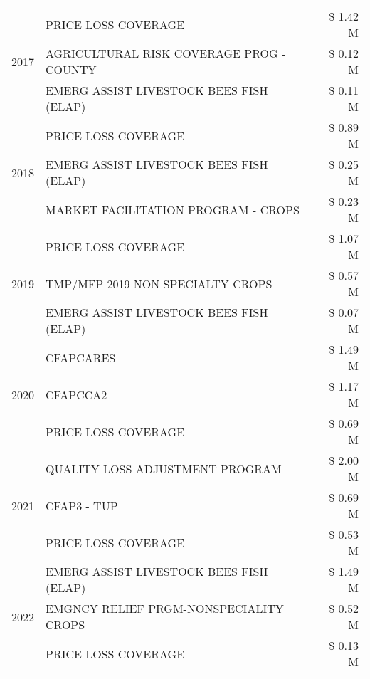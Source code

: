 \begin{tabular}{llr}
\cline{1-3}
\multirow[t]{3}{*}{2017} & PRICE LOSS COVERAGE & \$ 1.42 M \\
 & AGRICULTURAL RISK COVERAGE PROG - COUNTY & \$ 0.12 M \\
 & EMERG ASSIST LIVESTOCK BEES FISH (ELAP) & \$ 0.11 M \\
\cline{1-3}
\multirow[t]{3}{*}{2018} & PRICE LOSS COVERAGE & \$ 0.89 M \\
 & EMERG ASSIST LIVESTOCK BEES FISH (ELAP) & \$ 0.25 M \\
 & MARKET FACILITATION PROGRAM - CROPS & \$ 0.23 M \\
\cline{1-3}
\multirow[t]{3}{*}{2019} & PRICE LOSS COVERAGE & \$ 1.07 M \\
 & TMP/MFP 2019 NON SPECIALTY CROPS & \$ 0.57 M \\
 & EMERG ASSIST LIVESTOCK BEES FISH (ELAP) & \$ 0.07 M \\
\cline{1-3}
\multirow[t]{3}{*}{2020} & CFAPCARES & \$ 1.49 M \\
 & CFAPCCA2 & \$ 1.17 M \\
 & PRICE LOSS COVERAGE & \$ 0.69 M \\
\cline{1-3}
\multirow[t]{3}{*}{2021} & QUALITY LOSS ADJUSTMENT PROGRAM & \$ 2.00 M \\
 & CFAP3 - TUP & \$ 0.69 M \\
 & PRICE LOSS COVERAGE & \$ 0.53 M \\
\cline{1-3}
\multirow[t]{3}{*}{2022} & EMERG ASSIST LIVESTOCK BEES FISH (ELAP) & \$ 1.49 M \\
 & EMGNCY RELIEF PRGM-NONSPECIALITY CROPS & \$ 0.52 M \\
 & PRICE LOSS COVERAGE & \$ 0.13 M \\
\cline{1-3}
\bottomrule
\end{tabular}
